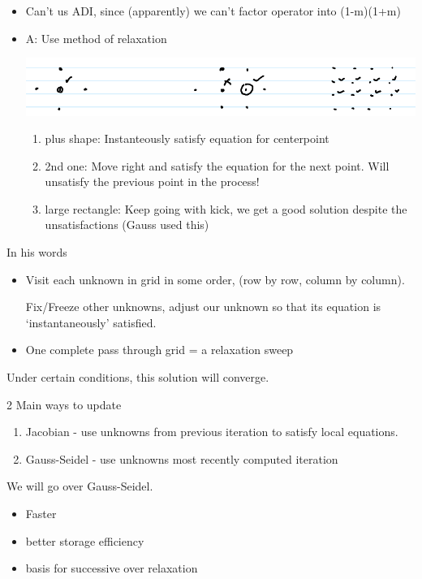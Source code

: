 \begin{itemize}
    \item Can't us ADI, since (apparently) we can't factor operator into (1-m)(1+m)

    \item A: Use method of relaxation

    \includegraphics[width = 0.7 \linewidth]{Images/relaxation_stencils.png}
    \begin{enumerate}
        \item plus shape: Instanteously satisfy equation for centerpoint

        \item 2nd one: Move right and satisfy the equation for the next point. Will unsatisfy the previous point in the process! 

        \item large rectangle: Keep going with kick, we get a good solution despite the unsatisfactions (Gauss used this)
    \end{enumerate}
    
\end{itemize}

In his words

\begin{itemize}
    \item Visit each unknown in grid in some order, (row by row, column by column).

    Fix/Freeze other unknowns, adjust our unknown so that its equation is `instantaneously' satisfied.

    \item One complete pass through grid = a relaxation sweep
\end{itemize}

Under certain conditions, this solution will converge.

2 Main ways to update

\begin{enumerate}
    \item Jacobian - use unknowns from previous iteration to satisfy local equations.
    \item Gauss-Seidel - use unknowns most recently computed iteration
\end{enumerate}

We will go over Gauss-Seidel.

\begin{itemize}
    \item Faster
    \item better storage efficiency
    \item basis for successive over relaxation
\end{itemize}

